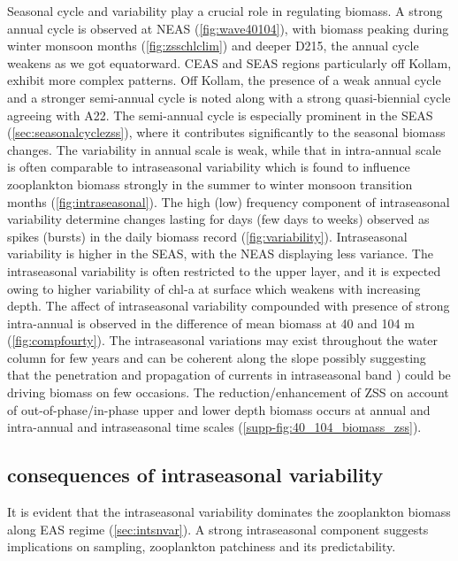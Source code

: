 \documentclass{article}
\begin{document}
	Seasonal cycle and variability play a crucial role in regulating biomass. A strong annual cycle is observed at NEAS (\cref{fig:wave40104}), with biomass peaking during winter monsoon months (\cref{fig:zsschlclim}) and deeper D215, the annual cycle weakens as we got equatorward. CEAS and SEAS regions particularly off Kollam, exhibit more complex patterns. Off Kollam, the presence of a weak annual cycle and a stronger semi-annual cycle is noted along with a strong quasi-biennial cycle agreeing with A22. The semi-annual cycle is especially prominent in the SEAS (\cref{sec:seasonalcyclezss}), where it contributes significantly to the seasonal biomass changes. The variability in annual scale is weak, while that in intra-annual scale is often comparable to intraseasonal variability which is found to influence zooplankton biomass strongly in the summer to winter monsoon transition months (\cref{fig:intraseasonal}). The high (low) frequency component of intraseasonal variability determine changes lasting for days (few days to weeks) observed as spikes (bursts) in the daily biomass record (\cref{fig:variability}). Intraseasonal variability is higher in the SEAS, with the NEAS displaying less variance. The intraseasonal variability is often restricted to the upper layer, and it is expected owing to higher variability of chl-a at surface which weakens with increasing depth. The affect of intraseasonal variability compounded with presence of strong intra-annual is observed in the difference of mean biomass at 40 and 104 m (\cref{fig:compfourty}). The intraseasonal variations may exist throughout the water column for few years and can be coherent along the slope possibly suggesting that the penetration and propagation of currents in intraseasonal band \citep{amol2012observational,amol2014observed,chaudhuri2020observed}) could be driving biomass on few occasions. The reduction/enhancement of ZSS on account of out-of-phase/in-phase upper and lower depth biomass occurs at annual and intra-annual and intraseasonal time scales (\cref{supp-fig:40_104_biomass_zss}).  
	
 	\subsection{consequences of intraseasonal variability}
	It is evident that the intraseasonal variability dominates the zooplankton biomass along EAS regime (\cref{sec:intsnvar}). A strong intraseasonal component suggests implications on sampling, zooplankton patchiness and its predictability. 
 
\end{document}
